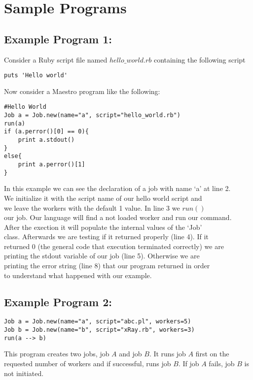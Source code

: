 \section{Sample Programs}
\label{sect:samples}
\subsection*{Example Program 1:}
Consider a Ruby script file named $hello\_world.rb$ containing the following script
\begin{verbatim}
puts 'Hello world'
\end{verbatim}

Now consider a Maestro program like the following:
\begin{verbatim}
#Hello World
Job a = Job.new(name="a", script="hello_world.rb")
run(a)
if (a.perror()[0] == 0){
    print a.stdout()
}
else{
    print a.perror()[1]
}
\end{verbatim}
In this example we can see the declaration of a job with name `a' at line 2.\\
We initialize it with the script name of our hello world script and\\
we leave the workers with the default 1 value. In line 3 we $run()$\\
our job. Our language will find a not loaded worker and run our command.\\
After the exection it will populate the internal values of the `Job'\\
class. Afterwards we are testing if it returned properly (line 4). If it\\
returned 0 (the general code that execution terminated correctly) we are\\
printing the stdout variable of our job (line 5). Otherwise we are\\
printing the error string (line 8) that our program returned in order\\
to understand what happened with our example.\\

\subsection*{Example Program 2:}
\begin{verbatim}
Job a = Job.new(name="a", script="abc.pl", workers=5)
Job b = Job.new(name="b", script="xRay.rb", workers=3)
run(a --> b)
\end{verbatim}

This program creates two jobs, job $A$ and job $B$. It runs job $A$ first on the requested number of workers
and if successful, runs job $B$. If job $A$ fails, job $B$ is not initiated.
\\

